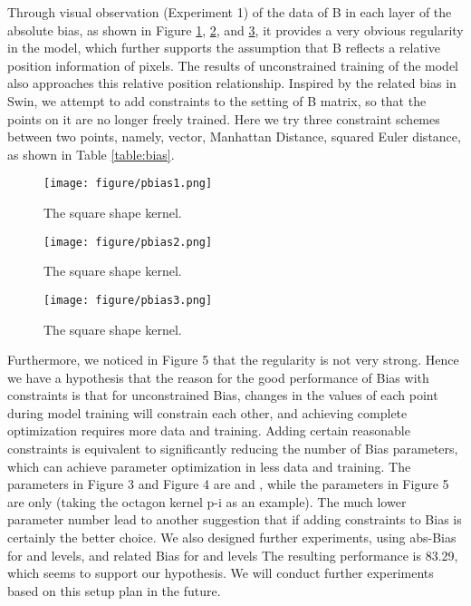 \documentclass{article}
\theoremstyle{plain}
\theoremstyle{definition}
\theoremstyle{remark}
\begin{document}
Through visual observation (Experiment 1) of the data of B in each layer of the absolute bias, as shown in Figure \ref{fig:pbias1}, \ref{fig:pbias2}, and \ref{fig:pbias3}, it provides a very obvious regularity in the model, which further supports the assumption that B reflects a relative position information of pixels. The results of unconstrained training of the model also approaches this relative position relationship. Inspired by the related bias in Swin, we attempt to add constraints to the setting of B matrix, so that the points on it are no longer freely trained. Here we try three constraint schemes between two points, namely, vector, Manhattan Distance, squared Euler distance, as shown in Table \ref{table:bias}.

\begin{figure}[h]
\centering
    \texttt{[image: figure/pbias1.png]}
\caption{The square shape kernel.}
\label{fig:pbias1}
\end{figure}
\begin{figure}[h]
\centering
    \texttt{[image: figure/pbias2.png]}
\caption{The square shape kernel.}
\label{fig:pbias2}
\end{figure}
\begin{figure}[h]
\centering
    \texttt{[image: figure/pbias3.png]}
\caption{The square shape kernel.}
\label{fig:pbias3}
\end{figure}

Furthermore, we noticed in Figure 5 that the regularity is not very strong. Hence we have a hypothesis that the reason for the good performance of Bias with constraints is that for unconstrained Bias, changes in the values of each point during model training will constrain each other, and achieving complete optimization requires more data and training. Adding certain reasonable constraints is equivalent to significantly reducing the number of Bias parameters, which can achieve parameter optimization in less data and training. The parameters in Figure 3 and Figure 4 are  and , while the parameters in Figure 5 are only  (taking the octagon kernel p-i as an example). The much lower parameter number lead to another suggestion that if adding constraints to Bias is certainly the better choice. We also designed further experiments, using abs-Bias for  and  levels, and related Bias for  and  levels The resulting performance is 83.29, which seems to support our hypothesis. We will conduct further experiments based on this setup plan in the future.
\end{document}
